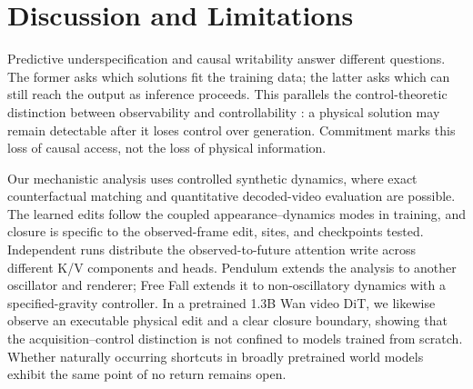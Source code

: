\section{Discussion and Limitations}

Predictive underspecification and causal writability answer different questions.
The former asks which solutions fit the training data; the latter asks which can
still reach the output as inference proceeds. This parallels the
control-theoretic distinction between observability and controllability
\citep{kalman1960general}: a physical solution may remain detectable after it
loses control over generation. Commitment marks this loss of causal access, not
the loss of physical information.

Our mechanistic analysis uses controlled synthetic dynamics, where exact
counterfactual matching and quantitative decoded-video evaluation are possible.
The learned edits follow the coupled appearance--dynamics modes in training, and
closure is specific to the observed-frame edit, sites, and checkpoints tested.
Independent runs distribute the observed-to-future attention write across
different K/V components and heads. Pendulum extends the analysis to another
oscillator and renderer; Free Fall extends it to non-oscillatory dynamics with a
specified-gravity controller. In a pretrained 1.3B Wan video DiT, we likewise
observe an executable physical
edit and a clear closure boundary, showing that the acquisition--control
distinction is not confined to models trained from scratch. Whether naturally
occurring shortcuts in broadly pretrained world models exhibit the same point
of no return remains open.
